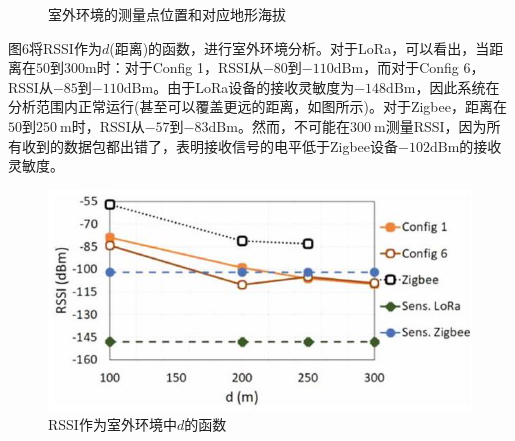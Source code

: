 \documentclass[10pt]{ctexart}
\begin{document}
\begin{figure}[H]
  \renewcommand{\figurename}{图}
  \caption{室外环境的测量点位置和对应地形海拔}
\end{figure}

图6将RSSI作为$d$(距离)的函数，进行室外环境分析。对于LoRa，可以看出，当距离在$50$到$300\mathrm{m}$时：对于Config 1，RSSI从$-80$到$-110\mathrm{dBm}$，而对于Config 6，RSSI从$-85$到$-110\mathrm{dBm}$。由于LoRa设备的接收灵敏度为$-148\mathrm{dBm}$，因此系统在分析范围内正常运行(甚至可以覆盖更远的距离，如图所示)。对于Zigbee，距离在$50$到$250\mathrm{~m}$时，RSSI从$-57$到$-83\mathrm{dBm}$。然而，不可能在$300 \mathrm{~m}$测量RSSI，因为所有收到的数据包都出错了，表明接收信号的电平低于Zigbee设备$-102\mathrm{dBm}$的接收灵敏度。

\begin{figure}[H]
  \centering
  \includegraphics[max width=\textwidth]{2022_02_28_100dc43db44c8290ce2ag-06}
  \renewcommand{\figurename}{图}
  \caption{RSSI作为室外环境中$d$的函数}
\end{figure}
\end{document}
